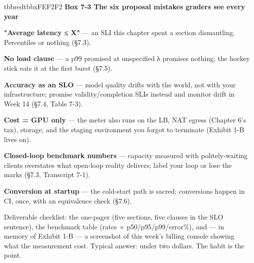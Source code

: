 \begin{calloutbox}{tbbred}{tbbxFEF2F2}
{\normalsize\bfseries\color{tbbx991B1B}Box 7-3  The six proposal mistakes graders see every year}\par\vspace{3pt}
\begin{tbbitemize}
  \item \textbf{"Average latency ≤ X"} — an SLI this chapter spent a section dismantling. Percentiles or nothing (§7.3).
  \item \textbf{No load clause} — a p99 promised at unspecified λ promises nothing; the hockey stick eats it at the first burst (§7.5).
  \item \textbf{Accuracy as an SLO} — model quality drifts with the world, not with your infrastructure; promise validity/completion SLIs instead and monitor drift in Week 14 (§7.4, Table 7-3).
  \item \textbf{Cost = GPU only} — the meter also runs on the LB, NAT egress (Chapter 6's tax), storage, and the staging environment you forgot to terminate (Exhibit 1-B lives on).
  \item \textbf{Closed-loop benchmark numbers} — capacity measured with politely-waiting clients overstates what open-loop reality delivers; label your loop or lose the marks (§7.3, Transcript 7-1).
  \item \textbf{Conversion at startup} — the cold-start path is sacred; conversions happen in CI, once, with an equivalence check (§7.6).
\end{tbbitemize}
\end{calloutbox}

\vspace{3.0pt}

Deliverable checklist: the one-pager (five sections, five clauses in the SLO sentence), the benchmark table (rates × p50/p95/p99/error\%), and — in memory of Exhibit 1-B — a screenshot of this week's billing console showing what the measurement cost. Typical answer: under two dollars. The habit is the point.

